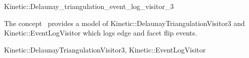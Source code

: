 

\begin{ccRefClass}{Kinetic::Delaunay_triangulation_event_log_visitor_3}


\ccDefinition
  
The concept \ccRefName\ provides a model of
Kinetic::DelaunayTriangulationVisitor3 and Kinetic::EventLogVisitor
which logs edge and facet flip events.

\ccIsModel

Kinetic::DelaunayTriangulationVisitor3, Kinetic::EventLogVisitor

\ccSeeAlso



\end{ccRefClass}



